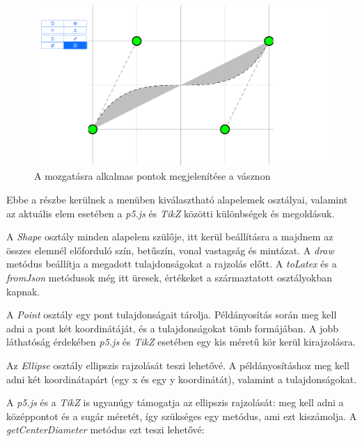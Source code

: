 \begin{figure}[!h]
	\label{fig:move}
	\centering
	\includegraphics[width=\textwidth]{images/editor_move.png}
	\caption{A mozgatásra alkalmas pontok megjelenítése a vásznon}
\end{figure}



Ebbe a részbe kerülnek a menüben kiválasztható alapelemek osztályai, valamint az aktuális elem esetében a  \textit{p5.js} és \textit{TikZ} közötti különbségek és megoldásuk. 


A \textit{Shape} osztály minden alapelem szülője, itt kerül beállításra a majdnem az összes elemnél előforduló szín, betűszín, vonal vastagság és mintázat. A \textit{draw} metódus beállítja a megadott tulajdonságokat a rajzolás előtt. A \textit{toLatex} és a \textit{fromJson} metódusok még itt üresek, értékeket a származtatott osztályokban kapnak.


A \textit{Point} osztály egy pont tulajdonságait tárolja. Példányosítás során meg kell adni a pont két koordinátáját, és a tulajdonságokat tömb formájában. A jobb láthatóság érdekében \textit{p5.js} és \textit{TikZ} esetében egy kis méretű kör kerül kirajzolásra. 


Az \textit{Ellipse} osztály ellipszis rajzolását teszi lehetővé. A példányosításhoz meg kell adni két koordinátapárt (egy x és egy y koordinátát), valamint a tulajdonságokat. 

A \textit{p5.js} és a \textit{TikZ} is ugyanúgy támogatja az ellipszis rajzolását: meg kell adni a középpontot és a sugár méretét, így szükséges egy metódus, ami ezt kiszámolja. A \textit{getCenterDiameter} metódus ezt teszi lehetővé:

